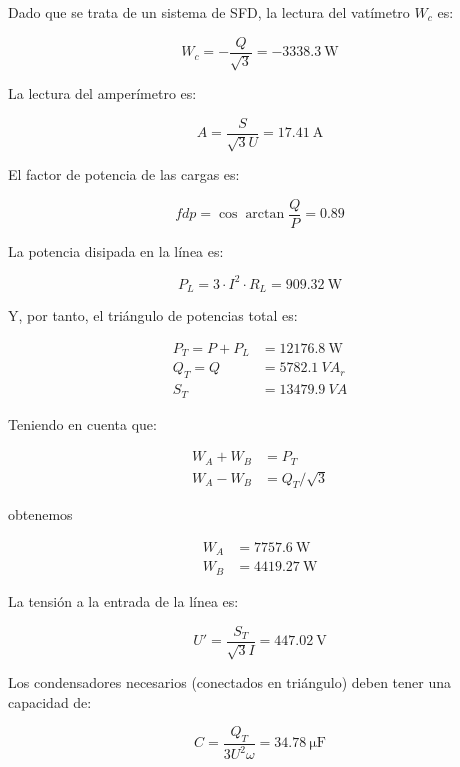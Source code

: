 \documentclass[12pt]{article}
\begin{document}
Dado que se trata de un sistema de SFD, la lectura del vatímetro $W_c$
es:

\begin{equation*}
  W_c = - \frac{Q}{\sqrt{3}} = \SI{-3338.3}{\watt}
\end{equation*}

La lectura del amperímetro es:

\begin{equation*}
  A = \frac{S}{\sqrt{3} U} = \SI{17.41}{\ampere}
\end{equation*}

El factor de potencia de las cargas es:

\begin{equation*}
  fdp = \cos{\arctan{\frac{Q}{P}}} = 0.89
\end{equation*}

La potencia disipada en la línea es:

\begin{equation*}
  P_L = 3 \cdot I^2 \cdot R_L = \SI{909.32}{\watt}
\end{equation*}

Y, por tanto, el triángulo de potencias total es:

\begin{align*}
  P_T = P + P_L &= \SI{12176.8}{\watt}\\
  Q_T = Q &= \SI{5782.1}{VA}_r\\
  S_T &= \SI{13479.9}{VA}
\end{align*}

Teniendo en cuenta que:

\begin{align*}
  W_A + W_B &= P_T\\
  W_A - W_B &= Q_T / \sqrt{3}
\end{align*}

obtenemos

\begin{align*}
  W_A &= \SI{7757.6}{\watt}\\
  W_B &= \SI{4419.27}{\watt}
\end{align*}

La tensión a la entrada de la línea es:

\begin{equation*}
  U' = \frac{S_T}{\sqrt{3} I} = \SI{447.02}{\volt}
\end{equation*}

Los condensadores necesarios (conectados en triángulo) deben tener una
capacidad de:

\begin{equation*}
  C = \frac{Q_T}{3U^2\omega} = \SI{34.78}{\micro\farad}
\end{equation*}
\end{document}
